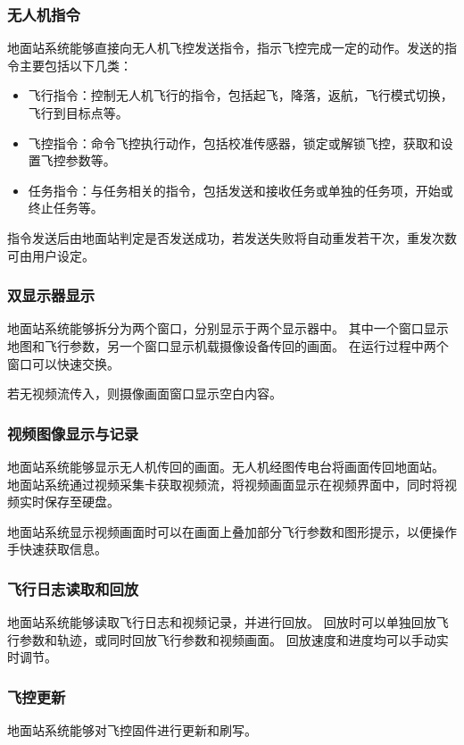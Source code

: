\subsubsection{无人机指令}
地面站系统能够直接向无人机飞控发送指令，指示飞控完成一定的动作。发送的指令主要包括以下几类：
\begin{itemize}
\setlength{\itemsep}{-2pt}
\item 飞行指令：控制无人机飞行的指令，包括起飞，降落，返航，飞行模式切换，飞行到目标点等。
\item 飞控指令：命令飞控执行动作，包括校准传感器，锁定或解锁飞控，获取和设置飞控参数等。
\item 任务指令：与任务相关的指令，包括发送和接收任务或单独的任务项，开始或终止任务等。
\end{itemize}

指令发送后由地面站判定是否发送成功，若发送失败将自动重发若干次，重发次数可由用户设定。

\subsubsection{双显示器显示}
地面站系统能够拆分为两个窗口，分别显示于两个显示器中。
其中一个窗口显示地图和飞行参数，另一个窗口显示机载摄像设备传回的画面。
在运行过程中两个窗口可以快速交换。

若无视频流传入，则摄像画面窗口显示空白内容。

\subsubsection{视频图像显示与记录}
地面站系统能够显示无人机传回的画面。无人机经图传电台将画面传回地面站。
地面站系统通过视频采集卡获取视频流，将视频画面显示在视频界面中，同时将视频实时保存至硬盘。

地面站系统显示视频画面时可以在画面上叠加部分飞行参数和图形提示，以便操作手快速获取信息。

\subsubsection{飞行日志读取和回放}
地面站系统能够读取飞行日志和视频记录，并进行回放。
回放时可以单独回放飞行参数和轨迹，或同时回放飞行参数和视频画面。
回放速度和进度均可以手动实时调节。

\subsubsection{飞控更新}
地面站系统能够对飞控固件进行更新和刷写。

